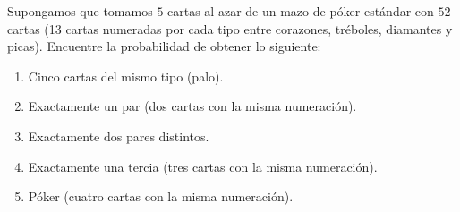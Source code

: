 \message{ !name(tarea2.tex)}\documentclass[12pt,a4paper]{article}
\begin{document}
    \begin{mdframed}[style=mdbluebox,frametitle={Ejercicio 4}]
        Supongamos que tomamos $5$ cartas al azar de un mazo de póker estándar con $52$ cartas 
        (13 cartas numeradas por cada tipo entre corazones, tréboles, diamantes y picas). 
        Encuentre la probabilidad de obtener lo siguiente:
        \begin{enumerate}
            \item[(a)] Cinco cartas del mismo tipo (palo).
            \item[(b)] Exactamente un par (dos cartas con la misma numeración).
            \item[(c)] Exactamente dos pares distintos.
            \item[(d)] Exactamente una tercia (tres cartas con la misma numeración).
            \item[(e)] Póker (cuatro cartas con la misma numeración).
        \end{enumerate}
    \end{mdframed}
\end{document}
